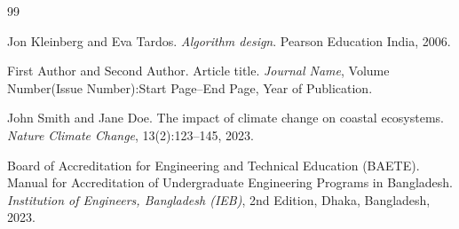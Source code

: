 \cleardoublepage
{}
\begin{thebibliography}{99}

Jon Kleinberg and Eva Tardos. \textit{Algorithm design}. Pearson Education India, 2006.

First Author and Second Author. Article title. \textit{Journal Name}, Volume Number(Issue Number):Start Page--End Page, Year of Publication.

John Smith and Jane Doe. The impact of climate change on coastal ecosystems. \textit{Nature Climate Change}, 13(2):123--145, 2023.

Board of Accreditation for Engineering and Technical Education (BAETE). Manual for Accreditation of Undergraduate Engineering Programs in Bangladesh. \textit{Institution of Engineers, Bangladesh (IEB)}, 2nd Edition, Dhaka, Bangladesh, 2023.

\end{thebibliography}
